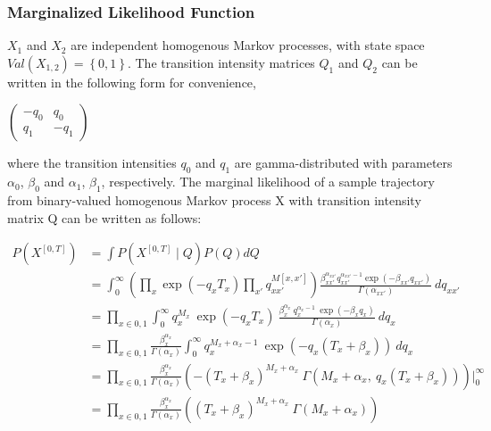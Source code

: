 \subsubsection{Marginalized Likelihood Function}

$ X_{1} $ and $ X_{2} $ are independent homogenous Markov processes, with state space $ Val(X_{1, 2}) = \left\lbrace 0, 1 \right\rbrace $. The transition intensity matrices $ Q_{1} $ and $ Q_{2} $ can be written in the following form for convenience,
\begin{center}
	\begin{math}
	\begin{pmatrix}
	-q_{0} & q_{0} \\
	q_{1} & -q_{1}
	\end{pmatrix}
	\end{math}\\
\end{center}
where the transition intensities $ q_{0} $ and $ q_{1} $ are gamma-distributed with parameters $ \alpha_{0}$, $ \beta_{0} $ and $ \alpha_{1} $, $ \beta_{1} $, respectively. The marginal likelihood of a sample trajectory from binary-valued homogenous Markov process X with transition intensity matrix Q can be written as follows:

\begin{align}
P(X^{[0, T]}) & = \int  P(X^{[0, T]}\mid Q)P(Q) dQ \\ & = \int_{0}^{\infty} \left( \prod_{x} \exp(-q_{x}T_{x}) \prod_{x'} q_{xx'}^{M[x, x']}\right) \frac{\beta_{xx'}^{\alpha_{xx'}}{q_{xx'}^{\alpha_{xx'}-1}}\exp(-\beta_{xx'}q_{xx'})}{\Gamma(\alpha_{xx'})} \ dq_{xx'} \\ & = \prod_{x\in{0,1}}\int_{0}^{\infty} q_{x}^{M_{x}} \ \exp(-q_{x}T_{x}) \  \frac{\beta_{x}^{\alpha_{x}} \ q_{x}^{\alpha_{x}-1}\ \exp(-\beta_{x}q_{x})}{\Gamma(\alpha_{x})} \ dq_{x} \\ & = \prod_{x\in{0,1}} \frac{\beta_{x}^{\alpha_{x}}}{\Gamma(\alpha_{x})} \int_{0}^{\infty} q_{x}^{M_{x} + \alpha_{x} -1} \ \exp(-q_{x}(T_{x}+\beta_{x})) \ dq_{x} \\ & = \prod_{x\in{0,1}} \frac{\beta_{x}^{\alpha_{x}}}{\Gamma(\alpha_{x})} \left( -(T_{x}+\beta_{x})^{M_{x} + \alpha_{x}}\ \Gamma(M_{x} + \alpha_{x}, \ q_{x}(T_{x}+\beta_{x})) \right) \Big|_0^\infty  \\ & = \prod_{x\in{0,1}} \frac{\beta_{x}^{\alpha_{x}}}{\Gamma(\alpha_{x})} \left( (T_{x}+\beta_{x})^{M_{x} + \alpha_{x}}\ \Gamma(M_{x} + \alpha_{x}) \right)
\label{eq:Marg_traj}
\end{align}

